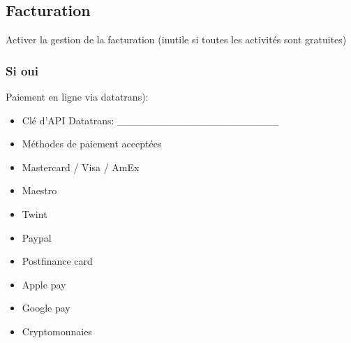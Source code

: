 \documentclass[letterpaper,10pt,english]{sphinxmanual}
\begin{document}
\subsection{Facturation}
\label{\detokenize{configurer:facturation}}
 Activer la gestion de la facturation (inutile si toutes les activités sont gratuites)


\subsubsection{Si oui}
\label{\detokenize{configurer:id1}}
 Paiement en ligne via datatrans):
\begin{itemize}
\item {} 
Clé d’API Datatrans: \_\_\_\_\_\_\_\_\_\_\_\_\_\_\_\_\_\_\_\_\_\_

\item {} 
Méthodes de paiement acceptées

\end{itemize}
\begin{itemize}
\item {} 
 Mastercard / Visa / AmEx

\item {} 
 Maestro

\item {} 
 Twint

\item {} 
 Paypal

\item {} 
 Postfinance card

\item {} 
 Apple pay

\item {} 
 Google pay

\item {} 
 Cryptomonnaies

\end{itemize}
\end{document}
